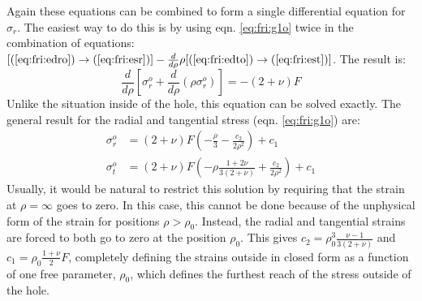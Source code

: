 Again these equations can be combined to form a single differential equation for $\sigma_r$.
The easiest way to do this is by using eqn. \ref{eq:fri:g1o} twice in the combination of equations: $[(\ref{eq:fri:edro}) \rightarrow (\ref{eq:fri:esr})]-\frac{d}{d \rho}\rho[(\ref{eq:fri:edto})\rightarrow(\ref{eq:fri:est})]$.
The result is:
\begin{equation}
	\frac{d}{d\rho}[\sigma_r^o+\frac{d}{d\rho}(\rho \sigma_r^o)]=-(2+\nu) F
	\label{eq:fri:comboout}
\end{equation}
Unlike the situation inside of the hole, this equation can be solved exactly.  The general result for the radial and tangential stress (eqn. \ref{eq:fri:g1o}) are:
\begin{align}
	\sigma_r^o&=(2+\nu)F(-\frac{\rho}{3}-\frac{c_2}{2 \rho^2})+c_1 \\
	\sigma_t^o&=(2+\nu)F(-\rho \frac{1+2 \nu}{3(2+\nu)}+\frac{c_2}{2 \rho^2})+c_1
\end{align}
Usually, it would be natural to restrict this solution by requiring that the strain at $\rho=\infty$ goes to zero.
In this case, this cannot be done because of the unphysical form of the strain for positions $\rho>\rho_0$.
Instead, the radial and tangential strains are forced to both go to zero at the position $\rho_0$.
This gives $c_2=\rho_0^3 \frac{\nu-1}{3(2+\nu)}$ and $c_1=\rho_0 \frac{1+\nu}{2} F$, completely defining the strains outside in closed form as a function of one free parameter, $\rho_0$, which defines the furthest reach of the stress outside of the hole.

